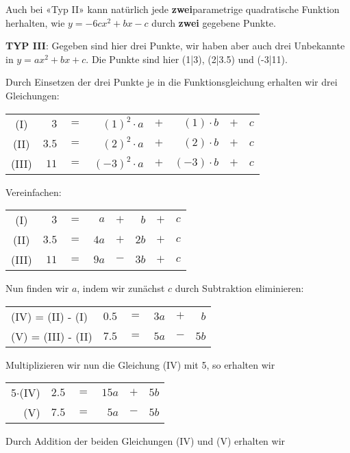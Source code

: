 Auch bei «Typ II» kann natürlich jede \textbf{zwei}parametrige quadratische
Funktion herhalten, wie \zB $y=-6cx^2 + bx - c$ durch \textbf{zwei}
gegebene Punkte.
\newpage


\textbf{TYP III}: Gegeben sind hier drei Punkte, wir haben aber auch
drei Unbekannte in $y = ax^2 + bx + c$. Die Punkte sind hier
(1|3), (2|3.5) und (-3|11).

Durch Einsetzen der drei Punkte je in die Funktionsgleichung erhalten
wir drei Gleichungen:

\begin{tabular}{c|r c rcrcr|}
  (I)   & $3$   & $=$ & $(1)^2\cdot{}a$  &$+$& $(1)\cdot{}b$  &$+$& $c$ \\ 
  (II)  & $3.5$ & $=$ & $(2)^2\cdot{}a$  &$+$& $(2)\cdot{}b$  &$+$& $c$ \\ 
  (III) & $11$  & $=$ & $(-3)^2\cdot{}a$ &$+$& $(-3)\cdot{}b$ &$+$& $c$ \\ 
\end{tabular}

Vereinfachen:

\begin{tabular}{c|r c rcrcr|}
  (I)   & $3$   & $=$ & $a$  &$+$& $b$  &$+$& $c$ \\ 
  (II)  & $3.5$ & $=$ & $4a$ &$+$& $2b$ &$+$& $c$ \\ 
  (III) & $11$  & $=$ & $9a$ &$-$& $3b$ &$+$& $c$ \\ 
\end{tabular}

Nun finden wir $a$, indem wir zunächst $c$ durch Subtraktion
eliminieren:

\begin{tabular}{l|r c rcr|}
  (IV) = (II) -   (I) & $0.5$  & $=$ & $3a$ &$+$& $b$ \\ 
  (V)  = (III) - (II) & $7.5$  & $=$ & $5a$ &$-$& $5b$ \\ 
\end{tabular}

Multiplizieren wir nun die Gleichung (IV) mit 5, so erhalten wir

\begin{tabular}{r|r c rcr|}
  5$\cdot{}$(IV)  & $2.5$  & $=$ & $15a$ &$+$& $5b$ \\ 
  (V)             & $7.5$  & $=$ & $5a$  &$-$& $5b$ \\ 
\end{tabular}

Durch Addition der beiden Gleichungen (IV) und (V) erhalten wir

